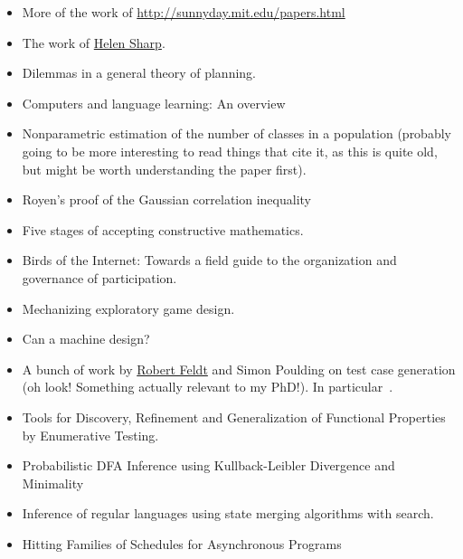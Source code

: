 \documentclass[a4paper]{book}
\begin{document}
\begin{itemize}
\item More of the work of \href{Nancy Leveson}{http://sunnyday.mit.edu/papers.html}
\item The work of \href{http://mcs.open.ac.uk/hcs2/}{Helen Sharp}.
\item Dilemmas in a general theory of planning\cite{rittel1973dilemmas}.
\item Computers and language learning: An overview\cite{warschauer1998computers}
\item Nonparametric estimation of the number of classes in a population\cite{chao1984nonparametric} (probably going to be more interesting to read things that cite it, as this is quite old, but might be worth understanding the paper first).
\item Royen’s proof of the Gaussian correlation inequality\cite{latala2017royen}
\item Five stages of accepting constructive mathematics\cite{bauer2017five}.
\item Birds of the Internet: Towards a field guide to the organization and governance of participation\cite{fish2011birds}.
\item Mechanizing exploratory game design\cite{smith2012mechanizing}.
\item Can a machine design?\cite{cross2001can}
\item A bunch of work by \href{http://www.robertfeldt.net/}{Robert Feldt} and Simon Poulding on test case generation
(oh look! Something actually relevant to my PhD!).
In particular~\cite{DBLP:conf/icst/PouldingF15, DBLP:conf/issre/FeldtP13, DBLP:conf/icse/FeldtP15}.
\item Tools for Discovery, Refinement and Generalization of Functional Properties by Enumerative Testing\cite{matela2017tools}.
\item Probabilistic DFA Inference using Kullback-Leibler Divergence and Minimality\cite{DBLP:conf/icml/ThollardDH00}
\item Inference of regular languages using state merging algorithms with search\cite{DBLP:journals/pr/BugalhoO05}.
\item Hitting Families of Schedules for Asynchronous Programs\cite{DBLP:conf/cav/ChistikovMN16}
\end{itemize}

{}

\end{document}
